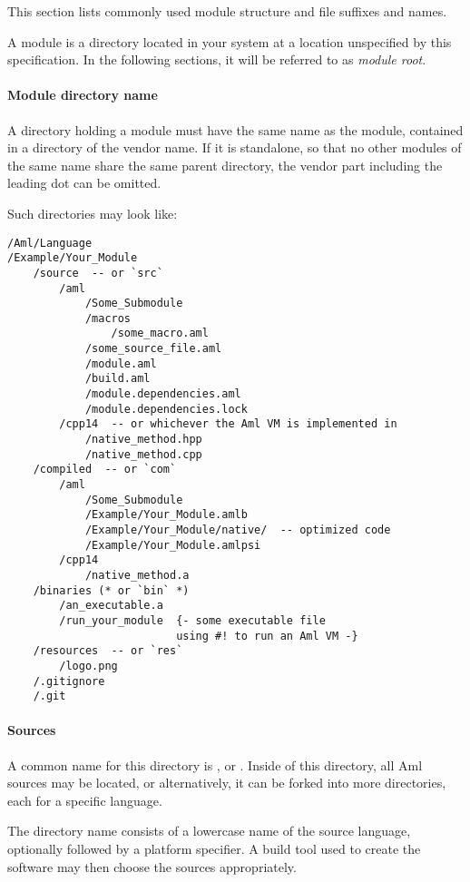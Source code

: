 This section lists commonly used module structure and file suffixes and names. 

A module is a directory located in your system at a location unspecified by this specification. In the following sections, it will be referred to as {\em module root}. 

\paragraph{Module directory name}
A directory holding a module must have the same name as the module, contained in a directory of the vendor name. If it is standalone, so that no other modules of the same name share the same parent directory, the vendor part including the leading dot can be omitted.

\example Such directories may look like:
\begin{lstlisting}[deletekeywords={module,native},mathescape=false]
/Aml/Language
/Example/Your_Module
    /source  -- or `src`
        /aml
            /Some_Submodule 
            /macros
                /some_macro.aml
            /some_source_file.aml
            /module.aml
            /build.aml
            /module.dependencies.aml
            /module.dependencies.lock
        /cpp14  -- or whichever the Aml VM is implemented in
            /native_method.hpp
            /native_method.cpp
    /compiled  -- or `com`
        /aml
            /Some_Submodule
            /Example/Your_Module.amlb
            /Example/Your_Module/native/  -- optimized code
            /Example/Your_Module.amlpsi
        /cpp14
            /native_method.a
    /binaries (* or `bin` *)
        /an_executable.a
        /run_your_module  {- some executable file 
                          using #! to run an Aml VM -}
    /resources  -- or `res`
        /logo.png
    /.gitignore
    /.git
\end{lstlisting} 

\paragraph{Sources}
A common name for this directory is , or . Inside of this directory, all Aml sources may be located, or alternatively, it can be forked into more directories, each for a specific language. 

The directory name consists of a lowercase name of the source language, optionally followed by a platform specifier. A build tool used to create the software may then choose the sources appropriately. 

